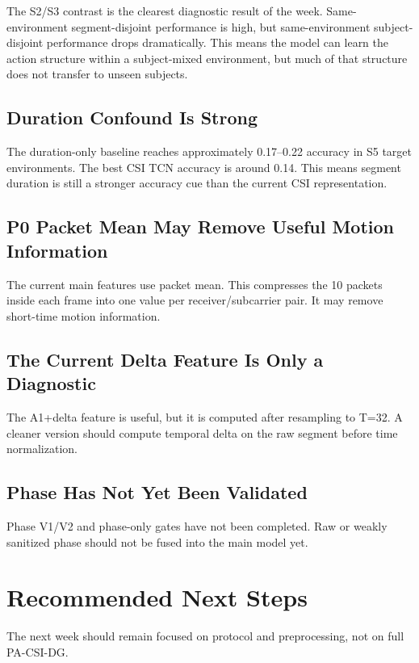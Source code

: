 \documentclass[11pt]{article}
\begin{document}
The S2/S3 contrast is the clearest diagnostic result of the week. Same-environment segment-disjoint performance is high, but same-environment subject-disjoint performance drops dramatically. This means the model can learn the action structure within a subject-mixed environment, but much of that structure does not transfer to unseen subjects.

\subsection{Duration Confound Is Strong}

The duration-only baseline reaches approximately 0.17--0.22 accuracy in S5 target environments. The best CSI TCN accuracy is around 0.14. This means segment duration is still a stronger accuracy cue than the current CSI representation.

\subsection{P0 Packet Mean May Remove Useful Motion Information}

The current main features use packet mean. This compresses the 10 packets inside each frame into one value per receiver/subcarrier pair. It may remove short-time motion information.

\subsection{The Current Delta Feature Is Only a Diagnostic}

The A1+delta feature is useful, but it is computed after resampling to T=32. A cleaner version should compute temporal delta on the raw segment before time normalization.

\subsection{Phase Has Not Yet Been Validated}

Phase V1/V2 and phase-only gates have not been completed. Raw or weakly sanitized phase should not be fused into the main model yet.

\section{Recommended Next Steps}

The next week should remain focused on protocol and preprocessing, not on full PA-CSI-DG.
\end{document}
